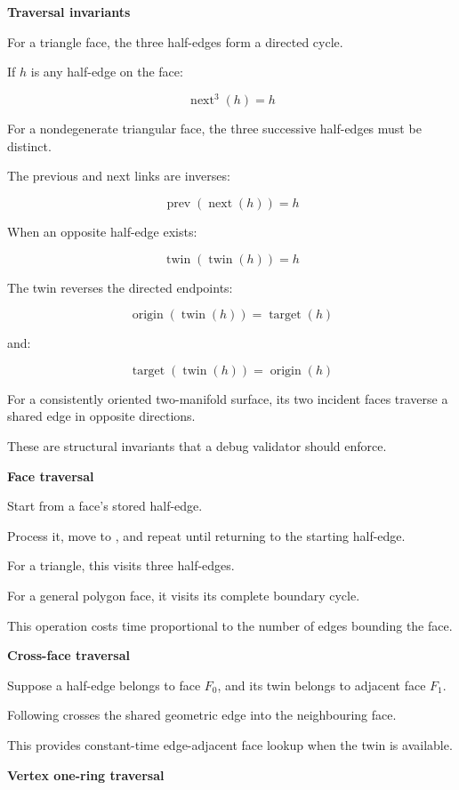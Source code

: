 \textbf{Traversal invariants}

For a triangle face, the three half-edges form a directed cycle.

If \(h\) is any half-edge on the face:

\[
\boxed{ \operatorname{next}^3(h)=h }
\]

For a nondegenerate triangular face, the three successive half-edges must be distinct.

The previous and next links are inverses:

\[
\boxed{ \operatorname{prev}(\operatorname{next}(h))=h }
\]

When an opposite half-edge exists:

\[
\boxed{ \operatorname{twin}(\operatorname{twin}(h))=h }
\]

The twin reverses the directed endpoints:

\[
\operatorname{origin}(\operatorname{twin}(h)) = \operatorname{target}(h)
\]

and:

\[
\operatorname{target}(\operatorname{twin}(h)) = \operatorname{origin}(h)
\]

For a consistently oriented two-manifold surface, its two incident faces traverse a shared edge in opposite directions.

These are structural invariants that a debug validator should enforce.

\textbf{Face traversal}

Start from a face's stored half-edge.

Process it, move to , and repeat until returning to the starting half-edge.

For a triangle, this visits three half-edges.

For a general polygon face, it visits its complete boundary cycle.

This operation costs time proportional to the number of edges bounding the face.

\textbf{Cross-face traversal}

Suppose a half-edge belongs to face \(F_0\), and its twin belongs to adjacent face \(F_1\).

Following  crosses the shared geometric edge into the neighbouring face.

This provides constant-time edge-adjacent face lookup when the twin is available.

\textbf{Vertex one-ring traversal}

